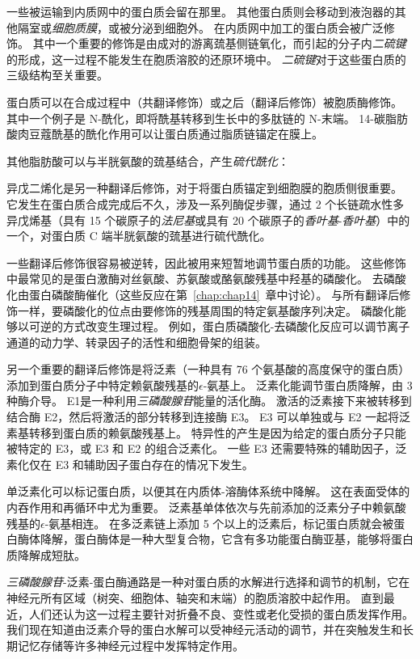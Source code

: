 一些被运输到内质网中的蛋白质会留在那里。
其他蛋白质则会移动到液泡器的其他隔室或\textit{细胞质膜}，或被分泌到细胞外。
在内质网中加工的蛋白质会被广泛修饰。
其中一个重要的修饰是由成对的游离巯基侧链氧化，而引起的分子内\textit{二硫键}的形成，这一过程不能发生在胞质溶胶的还原环境中。
\textit{二硫键}对于这些蛋白质的三级结构至关重要。


蛋白质可以在合成过程中（共翻译修饰）或之后（翻译后修饰）被胞质酶修饰。
其中一个例子是 N-酰化，即将酰基转移到生长中的多肽链的 N-末端。
14-碳脂肪酸肉豆蔻酰基的酰化作用可以让蛋白质通过脂质链锚定在膜上。


其他脂肪酸可以与半胱氨酸的巯基结合，产生\textit{硫代酰化}：

异戊二烯化是另一种翻译后修饰，对于将蛋白质锚定到细胞膜的胞质侧很重要。
它发生在蛋白质合成完成后不久，涉及一系列酶促步骤，通过 2 个长链疏水性多异戊烯基（具有 15 个碳原子的\textit{法尼基}或具有 20 个碳原子的\textit{香叶基}-\textit{香叶基}）中的一个，对蛋白质 C 端半胱氨酸的巯基进行硫代酰化。


一些翻译后修饰很容易被逆转，因此被用来短暂地调节蛋白质的功能。
这些修饰中最常见的是蛋白激酶对丝氨酸、苏氨酸或酪氨酸残基中羟基的磷酸化。
去磷酸化由蛋白磷酸酶催化（这些反应在第~\ref{chap:chap14}~章中讨论）。
与所有翻译后修饰一样，要磷酸化的位点由要修饰的残基周围的特定氨基酸序列决定。
磷酸化能够以可逆的方式改变生理过程。
例如，蛋白质磷酸化-去磷酸化反应可以调节离子通道的动力学、转录因子的活性和细胞骨架的组装。


另一个重要的翻译后修饰是将泛素（一种具有 76 个氨基酸的高度保守的蛋白质）添加到蛋白质分子中特定赖氨酸残基的$\epsilon$-氨基上。
泛素化能调节蛋白质降解，由 3 种酶介导。
E1是一种利用\textit{三磷酸腺苷}能量的活化酶。
激活的泛素接下来被转移到结合酶 E2，然后将激活的部分转移到连接酶 E3。
E3 可以单独或与 E2 一起将泛素基转移到蛋白质的赖氨酸残基上。
特异性的产生是因为给定的蛋白质分子只能被特定的 E3，或 E3 和 E2 的组合泛素化。
一些 E3 还需要特殊的辅助因子，泛素化仅在 E3 和辅助因子蛋白存在的情况下发生。


单泛素化可以标记蛋白质，以便其在内质体-溶酶体系统中降解。
这在表面受体的内吞作用和再循环中尤为重要。
泛素基单体依次与先前添加的泛素分子中赖氨酸残基的$\epsilon$-氨基相连。
在多泛素链上添加 5 个以上的泛素后，标记蛋白质就会被蛋白酶体降解，蛋白酶体是一种大型复合物，它含有多功能蛋白酶亚基，能够将蛋白质降解成短肽。


\textit{三磷酸腺苷}-泛素-蛋白酶通路是一种对蛋白质的水解进行选择和调节的机制，它在神经元所有区域（树突、细胞体、轴突和末端）的胞质溶胶中起作用。
直到最近，人们还认为这一过程主要针对折叠不良、变性或老化受损的蛋白质发挥作用。
我们现在知道由泛素介导的蛋白水解可以受神经元活动的调节，并在突触发生和长期记忆存储等许多神经元过程中发挥特定作用。


